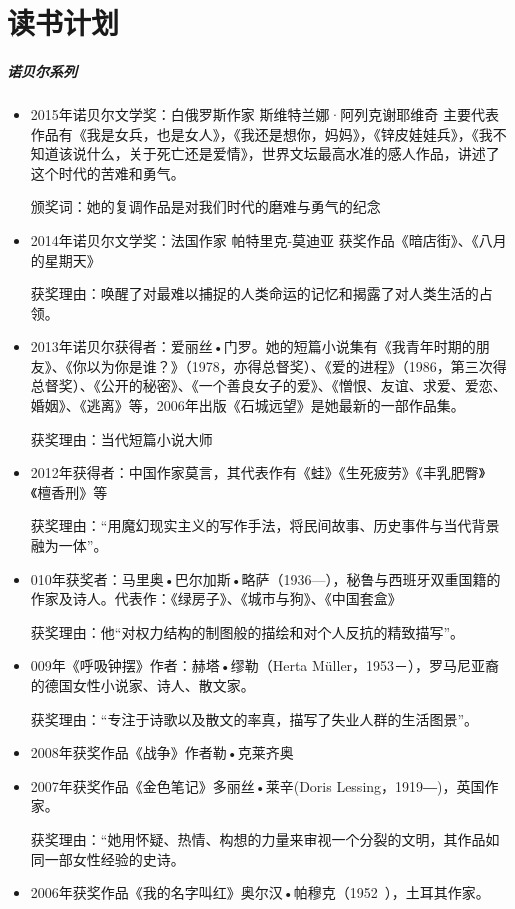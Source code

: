\documentclass[UTF8,a4paper,8pt]{ctexbook}
\begin{document}
	\section*{读书计划} 
		\subparagraph{诺贝尔系列}
		\begin{itemize}
			\item 2015年诺贝尔文学奖：白俄罗斯作家   斯维特兰娜·阿列克谢耶维奇 主要代表作品有《我是女兵，也是女人》，《我还是想你，妈妈》，《锌皮娃娃兵》，《我不知道该说什么，关于死亡还是爱情》，世界文坛最高水准的感人作品，讲述了这个时代的苦难和勇气。
			
			颁奖词：她的复调作品是对我们时代的磨难与勇气的纪念
			\item 2014年诺贝尔文学奖：法国作家   帕特里克-莫迪亚 获奖作品《暗店街》、《八月的星期天》
			
			获奖理由：唤醒了对最难以捕捉的人类命运的记忆和揭露了对人类生活的占领。
			\item 2013年诺贝尔获得者：爱丽丝•门罗。她的短篇小说集有《我青年时期的朋友》、《你以为你是谁？》（1978，亦得总督奖）、《爱的进程》（1986，第三次得总督奖）、《公开的秘密》、《一个善良女子的爱》、《憎恨、友谊、求爱、爱恋、婚姻》、《逃离》等，2006年出版《石城远望》是她最新的一部作品集。
			
			获奖理由：当代短篇小说大师
			\item 2012年获得者：中国作家莫言，其代表作有《蛙》《生死疲劳》《丰乳肥臀》《檀香刑》等
			
			获奖理由：“用魔幻现实主义的写作手法，将民间故事、历史事件与当代背景融为一体”。
			\item 010年获奖者：马里奥•巴尔加斯•略萨（1936—），秘鲁与西班牙双重国籍的作家及诗人。代表作：《绿房子》、《城市与狗》、《中国套盒》
			
			获奖理由：他“对权力结构的制图般的描绘和对个人反抗的精致描写”。
			\item 009年《呼吸钟摆》作者：赫塔•缪勒（Herta Müller，1953－），罗马尼亚裔的德国女性小说家、诗人、散文家。
			
			获奖理由：“专注于诗歌以及散文的率真，描写了失业人群的生活图景”。
			\item 2008年获奖作品《战争》作者勒•克莱齐奥
			\item 2007年获奖作品《金色笔记》多丽丝•莱辛(Doris Lessing，1919―)，英国作家。
			
			获奖理由：“她用怀疑、热情、构想的力量来审视一个分裂的文明，其作品如同一部女性经验的史诗。
			\item 2006年获奖作品《我的名字叫红》奥尔汉•帕穆克（1952~），土耳其作家。
			

\end{itemize}
\end{document}
